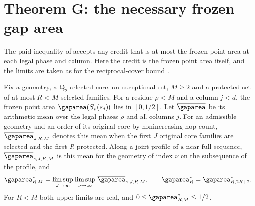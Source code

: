 \section{Theorem G: the necessary frozen gap area}\label{sec:gap-area}

The paid inequality of \cite[Theorem~3.5]{SourceCovers2026} accepts any credit that is
at most the frozen point area at each legal phase and column. Here the credit is the
frozen point area itself, and the limits are taken as for the reciprocal-cover bound
\cite[Theorem~4.6]{SourceCovers2026}.

\begin{definition}\label{def:gap-area-means}
Fix a geometry, a $\mathrm Q_2$ selected core, an exceptional set, $M\ge2$ and a
protected set of at most $R<M$ selected families. For a residue $\rho<M$ and a column
$j<d$, the frozen point area $\gaparea(S_\rho(s_j))$ lies in $[0,1/2]$. Let $\meanarea$
be its arithmetic mean over the legal phases $\rho$ and all columns $j$. For an admissible geometry and an order of its original core by
nonincreasing hop count, $\meanarea_{J,R,M}$ denotes this mean when the first $J$
original core families are selected and the first $R$ protected. Along a joint
profile of a near-full sequence, $\meanarea_{\nu,J,R,M}$ is this mean for the
geometry of index $\nu$ on the subsequence of the profile, and
\begin{equation}\label{eq:gap-area-limit}
 \limarea_{R,M}=\limsup_{J\to\infty}\,\limsup_{\nu\to\infty}\,\meanarea_{\nu,J,R,M},
 \qquad \limarea_R=\limarea_{R,2R+2}.
\end{equation}
For $R<M$ both upper limits are real, and $0\le\limarea_{R,M}\le1/2$.
\end{definition}

